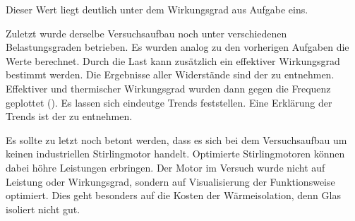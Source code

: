 Dieser Wert liegt deutlich unter dem Wirkungsgrad aus Aufgabe eins.

Zuletzt wurde derselbe Versuchsaufbau noch unter verschiedenen Belastungsgraden betrieben. Es wurden analog zu den vorherigen Aufgaben die Werte berechnet. 
Durch die Last kann zusätzlich ein effektiver Wirkungsgrad bestimmt werden. Die Ergebnisse aller Widerstände sind der  zu entnehmen.
Effektiver und thermischer Wirkungsgrad wurden dann gegen die Frequenz geplottet (). Es lassen sich eindeutge Trends feststellen. Eine Erklärung der Trends ist der  zu entnehmen. 

Es sollte zu letzt noch betont werden, dass es sich bei dem Versuchsaufbau um keinen industriellen Stirlingmotor handelt. Optimierte Stirlingmotoren können dabei höhre Leistungen erbringen. Der Motor im Versuch wurde nicht auf Leistung oder Wirkungsgrad, sondern auf Visualisierung der Funktionsweise optimiert. Dies geht besonders auf die Kosten der Wärmeisolation, denn Glas isoliert nicht gut. 



